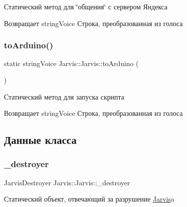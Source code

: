 Статический метод для \char`\"{}общения\char`\"{} с сервером Яндекса 

\begin{DoxyReturn}{Возвращает}
string\+Voice Строка, преобразованная из голоса 
\end{DoxyReturn}
\mbox{\label{classJarvis_1_1Jarvis_a2a9f9ca691361b0ef640ac5a150acb39}} 
\subsubsection{\texorpdfstring{to\+Arduino()}{toArduino()}}
{\footnotesize\ttfamily static string\+Voice Jarvis\+::\+Jarvis\+::to\+Arduino (\begin{DoxyParamCaption}{ }\end{DoxyParamCaption})\hspace{0.3cm}{\ttfamily [static]}}



Статический метод для запуска скрипта 

\begin{DoxyReturn}{Возвращает}
string\+Voice Строка, преобразованная из голоса 
\end{DoxyReturn}


\subsection{Данные класса}
\mbox{\label{classJarvis_1_1Jarvis_ab2ccf0fd1be13af518d79c8c3adb2042}} 
\subsubsection{\texorpdfstring{\+\_\+destroyer}{\_destroyer}}
{\footnotesize\ttfamily Jarvis\+Destroyer Jarvis\+::\+Jarvis\+::\+\_\+destroyer\hspace{0.3cm}{\ttfamily [static]}}

Статический объект, отвечающий за разрушение \hyperlink{classJarvis_1_1Jarvis}{Jarvis}\textquotesingle{}a \mbox{\label{classJarvis_1_1Jarvis_a52effab3870e7ba14e5a1fdbd5d2edc1}} 
